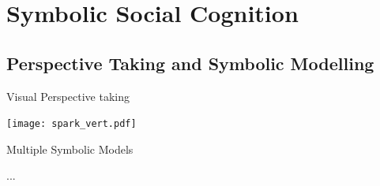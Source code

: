 \documentclass[compress]{beamer}
\begin{document}

\section{Symbolic Social Cognition}


\subsection{Perspective Taking and Symbolic Modelling}


\begin{frame}{Visual Perspective taking}


        \centering
        \texttt{[image: spark\_vert.pdf]}

\end{frame}


{
\begin{frame}{Multiple Symbolic Models}
        \begin{multicols}{2}
            \begin{figure}
                \resizebox{0.33\textwidth}{!}{\usebox{\ontoinstance}}
            \end{figure}
            \begin{figure}
                \resizebox{0.33\textwidth}{!}{\usebox{\ontoinstance}}
            \end{figure}
            \begin{figure}
                \resizebox{0.33\textwidth}{!}{\usebox{\ontoinstance}}
            \end{figure}
            {\vspace*{1.5cm}\hspace*{2.5cm}\huge...}
        \end{multicols}
\end{frame}
}
\end{document}
